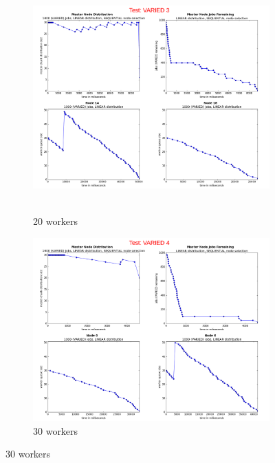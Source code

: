 \documentclass{article}
\begin{document}
\begin{figure}[p]
  
  \begin{subfigure}[b]{0.5\linewidth}
    \centering
    \hbox{\hspace{-5.0em} \includegraphics[width=1.2\linewidth]{combined_varied_growing_workers_linear/case_varied_3} }
    \caption{20 workers} 
    \label{testLinearVaried20} 
    \vspace{4ex}
  \end{subfigure}%
  \begin{subfigure}[b]{0.5\linewidth}
    \centering
    \includegraphics[width=1.2\linewidth]{combined_varied_growing_workers_linear/case_varied_4} 
    \caption{30 workers} 
    \label{testLinearVaried30} 
    \vspace{4ex}
  \end{subfigure} 
  

\end{figure}
\end{document}
